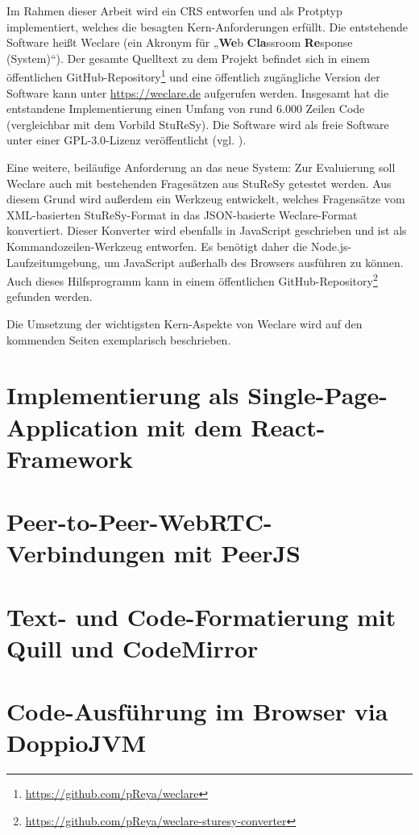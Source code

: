 Im Rahmen dieser Arbeit wird ein CRS entworfen und als Protptyp implementiert, welches die besagten Kern-Anforderungen erfüllt. Die entstehende Software heißt Weclare (ein Akronym für „\textbf{We}b \textbf{Cla}ssroom \textbf{Re}sponse (System)“). Der gesamte Quelltext zu dem Projekt befindet sich in einem öffentlichen GitHub-Repository\footnote{\url{https://github.com/pReya/weclare}} und eine öffentlich zugängliche Version der Software kann unter \url{https://weclare.de} aufgerufen werden. Insgesamt hat die entstandene Implementierung einen Umfang von rund 6.000 Zeilen Code (vergleichbar mit dem Vorbild StuReSy). Die Software wird als freie Software unter einer GPL-3.0-Lizenz veröffentlicht (vgl. \cite{web:github_weclare_license}).

Eine weitere, beiläufige Anforderung an das neue System: Zur Evaluierung soll Weclare auch mit bestehenden Fragesätzen aus StuReSy getestet werden. Aus diesem Grund wird außerdem ein Werkzeug entwickelt, welches Fragensätze vom XML-basierten StuReSy-Format in das JSON-basierte Weclare-Format konvertiert. Dieser Konverter wird ebenfalls in JavaScript geschrieben und ist als Kommandozeilen-Werkzeug entworfen. Es benötigt daher die Node.js-Laufzeitumgebung, um JavaScript außerhalb des Browsers ausführen zu können. Auch dieses Hilfsprogramm kann in einem öffentlichen GitHub-Repository\footnote{\url{https://github.com/pReya/weclare-sturesy-converter}} gefunden werden. 

Die Umsetzung der wichtigsten Kern-Aspekte von Weclare wird auf den kommenden Seiten exemplarisch beschrieben.

\newpage
\section{Implementierung als Single-Page-Application mit dem React-Framework}
\label{chap:react_einfuehrung}


\newpage
\section{Peer-to-Peer-WebRTC-Verbindungen mit PeerJS}
\label{chap:p2p}


\newpage
\section{Text- und Code-Formatierung mit Quill und CodeMirror}
\label{chap:formatierung}


\newpage
\section{Code-Ausführung im Browser via DoppioJVM}
\label{chap:ausfuehrung}
